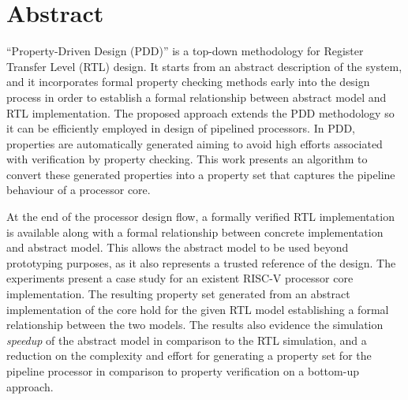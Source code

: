\chapter{Abstract}
“Property-Driven Design (PDD)” is a top-down methodology for Register Transfer Level (RTL) design. It starts from an abstract description of the system, and it incorporates formal property checking methods early into the design process in order to establish a formal relationship between abstract model and RTL implementation. The proposed approach extends the PDD methodology so it can be efficiently employed in design of pipelined processors. In PDD, properties are automatically generated aiming to avoid high efforts associated with verification by property checking. This work presents an algorithm to convert these generated properties into a property set that captures the pipeline behaviour of a processor core.

At the end of the processor design flow, a formally verified RTL implementation is available along with a formal relationship between concrete implementation and abstract model. This allows the abstract model to be used beyond prototyping purposes, as it also represents a trusted reference of the design. The experiments present a case study for an existent RISC-V processor core implementation. The resulting property set generated from an abstract implementation of the core hold for the given RTL model establishing a formal relationship between the two models. The results also evidence the simulation \textit{speedup} of the abstract model in comparison to the RTL simulation, and a reduction on the complexity and effort for generating a property set for the pipeline processor in comparison to property verification on a bottom-up approach.